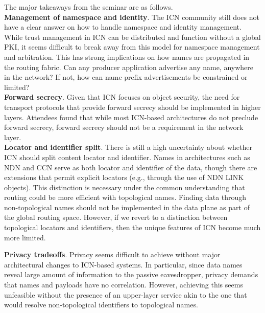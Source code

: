 \documentclass{sig-alternate-10pt}
\makeatletter
\renewcommand{\paragraph}[1]{\vspace*{0.03in}\noindent{\bf #1.}\hspace{0.25ex \@plus1ex \@minus.2ex}}
\makeatother
\begin{document}
\paragraph{Main Takeways} The major takeaways from the seminar are as follows. \\

\noindent
{\bf Management of namespace and identity}. The ICN community still does not have a clear answer on how to handle
namespace and identity management. While trust management in ICN can be distributed and function without a global PKI, it seems difficult to break away from this model for namespace management and arbitration. This has strong implications on how names are
propagated in the routing fabric. Can any producer application advertise any name,
anywhere in the network? If not, how can name prefix advertisements be constrained or limited? \\

\noindent
{\bf Forward secrecy}. Given that ICN focuses on object security, the need for transport
protocols that provide forward secrecy should be implemented in higher layers. Attendees
found that while most ICN-based architectures do not preclude forward secrecy, forward secrecy should
not be a requirement in the network layer.\\

\noindent
{\bf Locator and identifier split}. There is still a high uncertainty about whether ICN should split content
locator and identifier. Names in architectures such as NDN and CCN serve as both
locator and identifier of the data, though there are extensions that permit explicit locators
(e.g., through the use of NDN LINK objects). This distinction is necessary under the common understanding that 
routing could be more efficient with topological names. Finding
data through non-topological names should not be implemented in the data plane as part of the global
routing space. However, if we revert to a distinction between topological locators and
identifiers, then the unique features of ICN become much more limited. 

\noindent
{\bf Privacy tradeoffs}. Privacy seems difficult to achieve without major architectural changes to
ICN-based systems. In particular, since data names reveal large amount of information to
the passive eavesdropper, privacy demands that names and payloads have no correlation.
However, achieving this seems unfeasible without the presence of an upper-layer service
akin to the one that would resolve non-topological identifiers to topological names.\\
\end{document}
